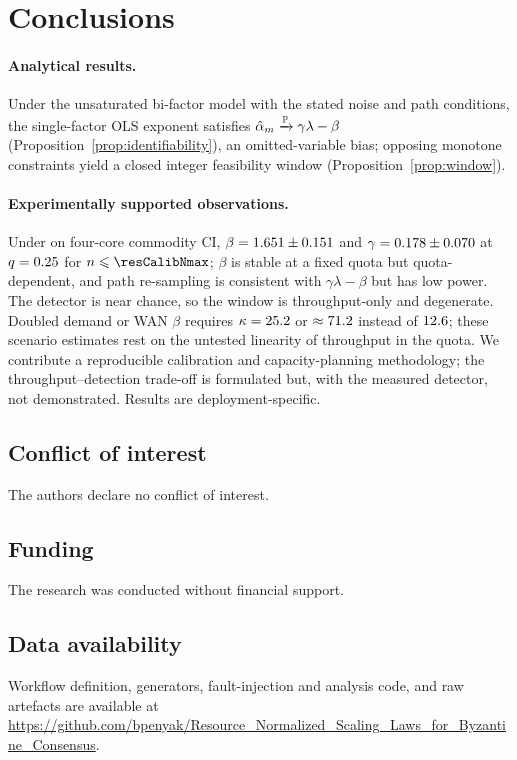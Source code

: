 \section{Conclusions}
\label{sec:conclusions}

\paragraph{Analytical results.}
Under the unsaturated bi-factor model with the stated noise and path
conditions, the single-factor OLS exponent satisfies
$\hat{\alpha}_{m}\xrightarrow{\mathbb{P}}\gamma\lambda-\beta$
(Proposition~\ref{prop:identifiability}), an \mbox{omitted-variable} bias;
opposing monotone constraints yield a closed integer feasibility window
(Proposition~\ref{prop:window}).

\paragraph{Experimentally supported observations.}
Under \RNM{} on four-core commodity CI, $\beta=1.651\pm0.151$ and
$\gamma=0.178\pm0.070$ at $q=0.25$ for $\n\le\resCalibNmax$; $\beta$ is
stable at a fixed quota but quota-dependent, and path re-sampling is consistent
with $\gamma\lambda-\beta$ but has low power. The detector is near chance, so the
window is throughput-only and degenerate. Doubled demand
or WAN $\beta$ requires $\kappa=25.2$ or $\approx71.2$
instead of $12.6$; these scenario estimates rest on the untested
linearity of throughput in the quota. We contribute a reproducible calibration
and capacity-planning methodology; the throughput--detection trade-off is
formulated but, with the measured detector, not demonstrated. Results are
deployment-specific.

\subsection*{Conflict of interest}
The authors declare no conflict of interest.

\subsection*{Funding}
The research was conducted without financial support.

\subsection*{Data availability}
Workflow definition, generators, fault-injection and analysis code, and raw
artefacts are available at
\url{https://github.com/bpenyak/Resource_Normalized_Scaling_Laws_for_Byzantine_Consensus}.

